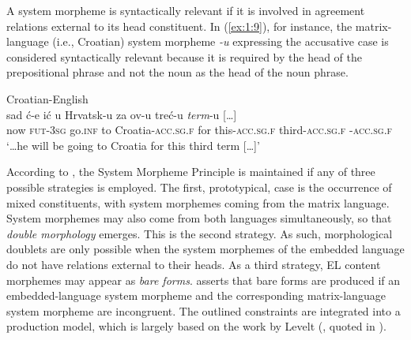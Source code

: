 \noindent A system morpheme is syntactically relevant if it is involved in agreement relations external to its head constituent. In (\ref{ex:1:9}), for instance, the matrix-language (i.e., Croatian) system morpheme \textit{-u} expressing the accusative case is considered  syntactically relevant because it is required by the head of the prepositional phrase and not the noun as the head of the noun phrase.

\ea{\label{ex:1:9}}
Croatian-English \citep[115]{hlavac-second-generation-2003}\\
\gll {\dots} sad ć-e ić u Hrvatsk-u za ov-u treć-u \textit{term}-u [{\dots}]\\
	{} now \textsc{fut-3sg} go.\textsc{inf} to Croatia-\textsc{acc.sg.f} for this-\textsc{acc.sg.f} third-\textsc{acc.sg.f} \phantom{term}-\textsc{acc.sg.f}\\
\glt `\dots he will be going to Croatia for this third term [\dots]'
\z

According to \citet[110]{myers-scotton-duelling-1993}, the System Morpheme Principle is maintained if any of three possible strategies is employed. The first, prototypical, case is the occurrence of mixed constituents, with system morphemes coming from the matrix language. System morphemes may also come from both languages simultaneously, so that \textit{double morphology} emerges. This is the second strategy. As such, morphological doublets are only possible when the system morphemes of the embedded language do not have relations external to their heads. As a third strategy, EL content morphemes may appear as \textit{bare forms}. \citet[112]{myers-scotton-duelling-1993} asserts that bare forms are produced if an embedded-language system morpheme and the corresponding matrix-language system morpheme are incongruent. The outlined constraints are integrated into a production model, which is largely based on the work by Levelt (\citeyear{levelt89}, quoted in \citealt[][]{myers-scotton-duelling-1993}).

